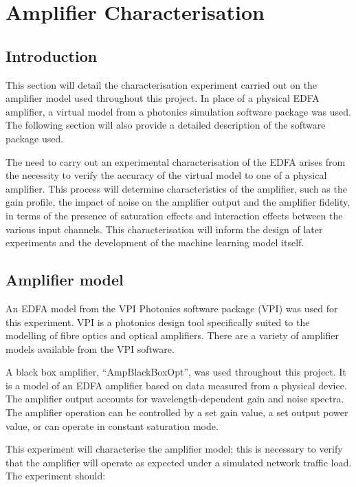 \newpage
\section{Amplifier Characterisation}
\label{tw:sec:amp_char}


\subsection{Introduction}
This section will detail the characterisation experiment carried out on the amplifier model used throughout this project. In place of a physical EDFA amplifier, a virtual model from a photonics simulation software package was used. The following section will also provide a detailed description of the software package used.

The need to carry out an experimental characterisation of the EDFA arises from the necessity to verify the accuracy of the virtual model to one of a physical amplifier. This process will determine characteristics of the amplifier, such as the gain profile, the impact of noise on the amplifier output and the amplifier fidelity, in terms of the presence of saturation effects and interaction effects between the various input channels. This characterisation will inform the design of later experiments and the development of the machine learning model itself.

\subsection{Amplifier model}
An EDFA model from the VPI Photonics software package (VPI) was used for this experiment. VPI is a photonics design tool specifically suited to the modelling of fibre optics and optical amplifiers. There are a variety of amplifier models available from the VPI software. 

A black box amplifier, “AmpBlackBoxOpt”, was used throughout this project. It is a model of an EDFA amplifier based on data measured from a physical device. The amplifier output accounts for wavelength-dependent gain and noise spectra. The amplifier operation can be controlled by a set gain value, a set output power value, or can operate in constant saturation mode.

This experiment will characterise the amplifier model; this is necessary to verify that the amplifier will operate as expected under a simulated network traffic load.  The experiment should:

